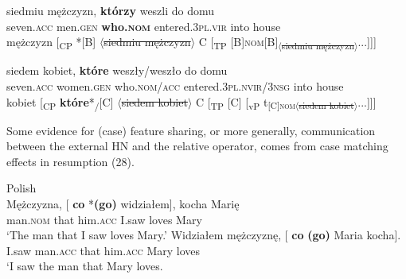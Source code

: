 \documentclass[output=paper]{langsci/langscibook}
\begin{document}
\ea%
    \label{ex:leska:26}
    \gll siedmiu   mężczyzn,   \textbf{którzy}   weszli     do   domu\\
         seven.\textsc{acc}   men.\textsc{gen}   \textbf{who.\textsc{nom}}   entered.\textsc{3pl.vir} into   house \\
    \glt {} mężczyzn [\textsubscript{CP} *[B] $\langle$\sout{siedmiu mężczyzn}$\rangle$ C [\textsubscript{TP} [B]{\footnotesize\textsc{nom}}\relax [\textsubscript{vP} \ConnectHead[5ex]{t\textsubscript{którzy}}[B]\textsubscript{$\langle$\sout{siedmiu mężczyzn}$\rangle$}...]]]
\z
\pagebreak

\ea%
    \label{ex:leska:27}
    \gll siedem   kobiet,   \textbf{które}     weszły/weszło       do domu\\
           seven.\textsc{acc}   women.\textsc{gen}   who.\textsc{nom/acc}   entered.\textsc{3pl.nvir/3nsg} into house\\
    \glt {} kobiet [\textsubscript{CP} \textbf{które}*\textsubscript{\slash}[C] $\langle$\sout{siedem kobiet}$\rangle$ C [\textsubscript{TP} [C] [\textsubscript{vP} t\textsubscript{[C]{\footnotesize\scshape nom}$\langle$\sout{siedem kobiet}$\rangle$}...]]]
\z

 
Some evidence for (case) feature sharing, or more generally, communication between the external HN and the relative operator, comes from case matching effects in resumption (28).

\ea%
    Polish\label{ex:leska:28}\\
    \ea
    \gll Mężczyzna, [ \textbf{co} *\textbf{(go)}   widziałem],   kocha   Marię     \\
          man.\textsc{nom} {}  that him.\textsc{acc}   I.saw     loves   Mary\\
    \glt ‘The man that I saw loves Mary.’
    \ex
    \gll  Widziałem   mężczyznę, [  \textbf{co} \textbf{(go)}   Maria   kocha]. \\
          I.saw     man.\textsc{acc} {}  that him.\textsc{acc}   Mary   loves\\
    \glt ‘I saw the man that Mary loves.
    \z
\z
\end{document}
